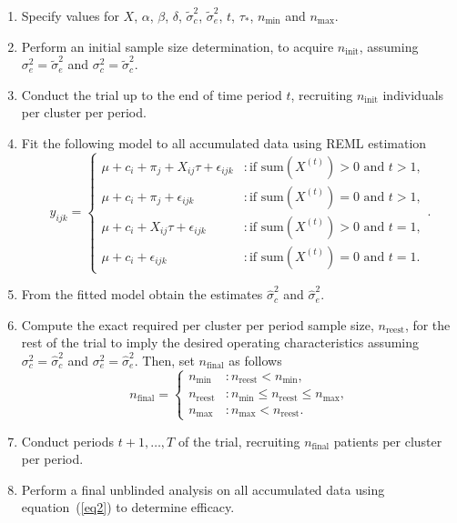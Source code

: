 \documentclass{article}
\begin{document}
\begin{enumerate}
	\item Specify values for $X$, $\alpha$, $\beta$, $\delta$, $\tilde{\sigma}_c^2$, $\tilde{\sigma}_e^2$, $t$, $\tau_*$, $n_{\text{min}}$ and $n_{\text{max}}$.
	\item Perform an initial sample size determination, to acquire $n_{\text{init}}$, assuming $\sigma_e^2=\tilde{\sigma}_e^2$ and $\sigma_c^2=\tilde{\sigma}_c^2$.
	\item Conduct the trial up to the end of time period $t$, recruiting $n_{\text{init}}$ individuals per cluster per period.
	\item Fit the following model to all accumulated data using REML estimation
	\[ y_{ijk} = \begin{cases}
	\mu + c_i + \pi_j + X_{ij}\tau + \epsilon_{ijk}& : \text{if } \text{sum}(X^{(t)})>0\text{ and }t>1,\\
	\mu + c_i + \pi_j + \epsilon_{ijk}& : \text{if } \text{sum}(X^{(t)})=0\text{ and }t>1,\\
	\mu + c_i + X_{ij}\tau + \epsilon_{ijk} & : \text{if } \text{sum}(X^{(t)})>0\text{ and }t=1,\\
	\mu + c_i + \epsilon_{ijk} & : \text{if } \text{sum}(X^{(t)})=0\text{ and }t=1.
	\end{cases}. \]
	\item From the fitted model obtain the estimates $\hat{\sigma}_c^2$ and $\hat{\sigma}_e^2$.
	\item Compute the exact required per cluster per period sample size, $n_{\text{reest}}$, for the rest of the trial to imply the desired operating characteristics assuming $\sigma_c^2=\hat{\sigma}_c^2$ and $\sigma_e^2=\hat{\sigma}_e^2$. Then, set $n_{\text{final}}$ as follows
	\[ n_\text{final}=\begin{cases}
	n_\text{min} &: n_\text{reest} < n_\text{min},\\
	n_\text{reest} &: n_\text{min} \le n_\text{reest} \le n_\text{max},\\
	n_\text{max} &: n_\text{max} < n_\text{reest}.
	\end{cases} \]
	\item Conduct periods $t+1,\dots,T$ of the trial, recruiting $n_{\text{final}}$ patients per cluster per period.
	\item Perform a final unblinded analysis on all accumulated data using equation~(\ref{eq2}) to determine efficacy.
\end{enumerate}
\end{document}
